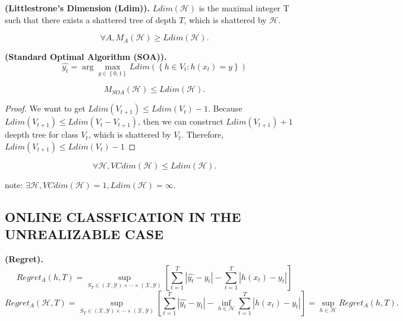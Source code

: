 \begin{definition}
    \textbf{(Littlestrone's Dimension (Ldim)).}
    $ Ldim(\mathcal{H}) $ is the maximal integer T such that there exists a shattered tree of depth $ T $, which is shattered by $ \mathcal{H} $.
\end{definition}

\begin{lemma}
    \[
        \forall A, M_A(\mathcal{H}) \ge Ldim(\mathcal{H}).
    \]
\end{lemma}

\begin{definition}
    \textbf{(Standard Optimal Algorithm (SOA)).}
    \[
       \hat{y_t} = \arg\max_{y \in \left\{ 0, 1 \right\}} Ldim( \left\{ h \in V_t: h(x_t) = y \right\} )   
    \]
\end{definition}

\begin{lemma}
    \[
        M_{SOA}(\mathcal{H}) \le Ldim(\mathcal{H}).
    \]
    \begin{proof}
        We want to get $ Ldim(V_{t+1}) \le Ldim(V_{t}) - 1 $.
        Because $ Ldim(V_{t+1}) \le Ldim(V_t - V_{t+1}) $, then we can construct $ Ldim(V_{t+1})+1 $ deepth tree for class $ V_t $, which is shattered by $ V_t $. Therefore, $ Ldim(V_{t+1}) \le Ldim(V_t) - 1 $
    \end{proof}
\end{lemma}

\begin{theorem}
    \[
        \forall \mathcal{H}, VCdim(\mathcal{H}) \le Ldim(\mathcal{H}).
    \]
\end{theorem}
note: $ \exists \mathcal{H}, VCdim(\mathcal{H}) = 1, Ldim(\mathcal{H}) = \infty $.

\subsection{ONLINE CLASSFICATION IN THE UNREALIZABLE CASE}%
\label{sub:online_classfication_in_the_unrealizable_case}

\begin{definition}
    \textbf{(Regret).}
    \[
        Regret_{A}(h, T) = \sup_{S_T \in (\mathcal{X}, \mathcal{Y})\times\cdots\times(\mathcal{X}, \mathcal{Y})}
        \left[ \sum^{T}_{t=1} \left| \hat{y_t} - y_t \right| - \sum^{T}_{t = 1} \left| h(x_t) - y_t \right| \right]
    \]
    \[
        Regret_{A}(\mathcal{H}, T) = \sup_{S_T \in (\mathcal{X}, \mathcal{Y})\times\cdots\times(\mathcal{X}, \mathcal{Y})}
        \left[ \sum^{T}_{t=1} \left| \hat{y_t} - y_t \right| - \inf_{h \in \mathcal{H}}\sum^{T}_{t = 1} \left| h(x_t) - y_t \right| \right]
        = \sup_{h\in\mathcal{H}} Regret_{A}(h, T).
    \]
\end{definition}

